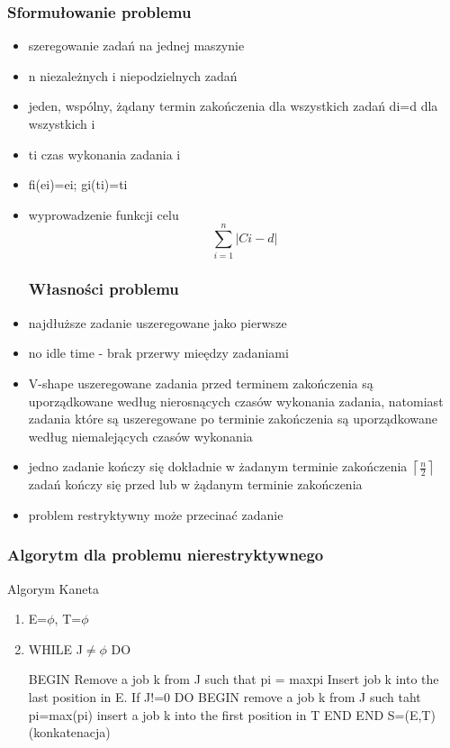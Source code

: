 \documentclass[12pt,a4paper]{article}
\begin{document}
\subsubsection{Sformułowanie problemu}
\begin{itemize}
\item szeregowanie zadań na jednej maszynie
\item n niezależnych i niepodzielnych zadań
\item jeden, wspólny, żądany termin zakończenia dla wszystkich zadań di=d dla wszystkich i
\item ti czas wykonania zadania i
\item fi(ei)=ei; gi(ti)=ti
\item wyprowadzenie funkcji celu
\begin{equation}
\sum\limits_{i=1}^{n}\left | Ci-d \right |
\end{equation}
\subsubsection{Własności problemu}
\item najdłuższe zadanie uszeregowane jako pierwsze
\item no idle time - brak przerwy mieędzy zadaniami
\item V-shape uszeregowane zadania przed terminem zakończenia są uporządkowane według nierosnących czasów wykonania zadania, natomiast zadania które są uszeregowane po terminie zakończenia są uporządkowane według niemalejących czasów wykonania
\item jedno zadanie kończy się dokładnie w żadanym terminie zakończenia $\left \lceil \frac{n}{2} \right \rceil$ zadań kończy się przed lub w żądanym terminie zakończenia
\item problem restryktywny może przecinać zadanie
\end{itemize}
\subsubsection{Algorytm dla problemu nierestryktywnego}
Algorym Kaneta
\begin{enumerate}
\item E=$\phi$, T=$\phi$
\item WHILE J$\neq \phi$ DO

BEGIN
Remove a job k from J such that pi = max{pi}
Insert job k into the last position in E.
If J!=0 DO
BEGIN remove a job k from J such taht pi=max(pi)
insert a job k into the first position in T
END
END
S=(E,T) (konkatenacja)
\end{enumerate}
\end{document}
